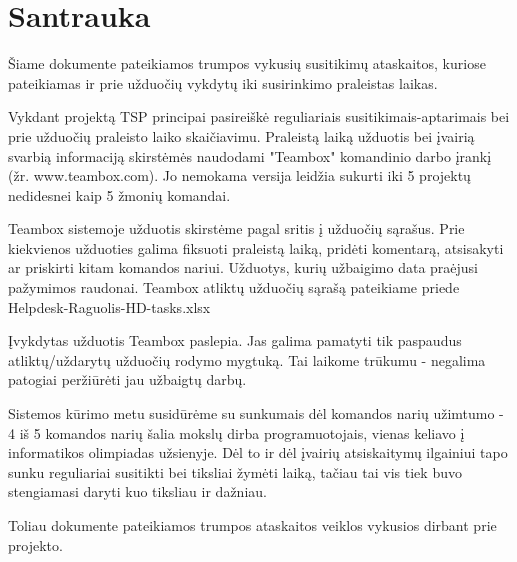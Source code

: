 \section{Santrauka}

	Šiame dokumente pateikiamos trumpos vykusių susitikimų ataskaitos, 
	kuriose pateikiamas ir prie užduočių vykdytų iki susirinkimo praleistas laikas.
	
	Vykdant projektą TSP principai pasireiškė reguliariais susitikimais-aptarimais bei prie užduočių praleisto laiko skaičiavimu.
	Praleistą laiką užduotis bei įvairią svarbią informaciją skirstėmės naudodami "Teambox" komandinio darbo įrankį
	(žr. www.teambox.com). Jo nemokama versija leidžia sukurti iki 5 projektų nedidesnei kaip 5 žmonių komandai.
	
	Teambox sistemoje užduotis skirstėme pagal sritis į užduočių sąrašus. 
	Prie kiekvienos užduoties galima fiksuoti praleistą laiką, pridėti komentarą, atsisakyti ar priskirti kitam komandos nariui.
	Užduotys, kurių užbaigimo data praėjusi pažymimos raudonai.
	Teambox atliktų užduočių sąrašą pateikiame priede Helpdesk-Raguolis-HD-tasks.xlsx
	
	Įvykdytas užduotis Teambox paslepia. 
	Jas galima pamatyti tik paspaudus atliktų/uždarytų užduočių rodymo mygtuką.
	Tai laikome trūkumu - negalima patogiai peržiūrėti jau užbaigtų darbų.
	
	Sistemos kūrimo metu susidūrėme su sunkumais dėl komandos narių užimtumo - 
	4 iš 5 komandos narių šalia mokslų dirba programuotojais, vienas keliavo į informatikos olimpiadas užsienyje.
	Dėl to ir dėl įvairių atsiskaitymų ilgainiui tapo sunku reguliariai susitikti bei tiksliai žymėti laiką,
	tačiau tai vis tiek buvo stengiamasi daryti kuo tiksliau ir dažniau.
	
	Toliau dokumente pateikiamos trumpos ataskaitos veiklos vykusios dirbant prie projekto.
	